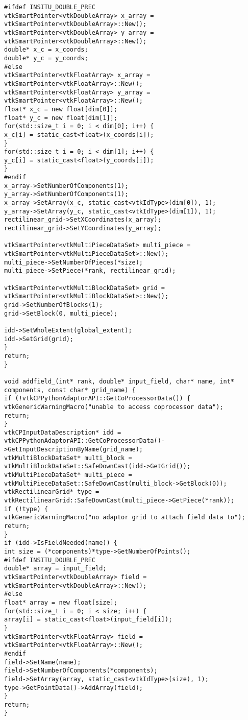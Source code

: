 \begin{lstlisting}[style=CXX, caption=C++ adaptor for ParaView Catalyst]
#ifdef INSITU_DOUBLE_PREC
vtkSmartPointer<vtkDoubleArray> x_array = vtkSmartPointer<vtkDoubleArray>::New();
vtkSmartPointer<vtkDoubleArray> y_array = vtkSmartPointer<vtkDoubleArray>::New();
double* x_c = x_coords;
double* y_c = y_coords;
#else
vtkSmartPointer<vtkFloatArray> x_array = vtkSmartPointer<vtkFloatArray>::New();
vtkSmartPointer<vtkFloatArray> y_array = vtkSmartPointer<vtkFloatArray>::New();
float* x_c = new float[dim[0]];
float* y_c = new float[dim[1]];
for(std::size_t i = 0; i < dim[0]; i++) {
x_c[i] = static_cast<float>(x_coords[i]);
}
for(std::size_t i = 0; i < dim[1]; i++) {
y_c[i] = static_cast<float>(y_coords[i]);
}
#endif
x_array->SetNumberOfComponents(1);
y_array->SetNumberOfComponents(1);
x_array->SetArray(x_c, static_cast<vtkIdType>(dim[0]), 1);
y_array->SetArray(y_c, static_cast<vtkIdType>(dim[1]), 1);
rectilinear_grid->SetXCoordinates(x_array);
rectilinear_grid->SetYCoordinates(y_array);

vtkSmartPointer<vtkMultiPieceDataSet> multi_piece = vtkSmartPointer<vtkMultiPieceDataSet>::New();
multi_piece->SetNumberOfPieces(*size);
multi_piece->SetPiece(*rank, rectilinear_grid);

vtkSmartPointer<vtkMultiBlockDataSet> grid = vtkSmartPointer<vtkMultiBlockDataSet>::New();
grid->SetNumberOfBlocks(1);
grid->SetBlock(0, multi_piece);

idd->SetWholeExtent(global_extent);
idd->SetGrid(grid);
}
return;
}

void addfield_(int* rank, double* input_field, char* name, int* components, const char* grid_name) {
if (!vtkCPPythonAdaptorAPI::GetCoProcessorData()) {
vtkGenericWarningMacro("unable to access coprocessor data");
return;
}
vtkCPInputDataDescription* idd = vtkCPPythonAdaptorAPI::GetCoProcessorData()->GetInputDescriptionByName(grid_name);
vtkMultiBlockDataSet* multi_block = vtkMultiBlockDataSet::SafeDownCast(idd->GetGrid());
vtkMultiPieceDataSet* multi_piece = vtkMultiPieceDataSet::SafeDownCast(multi_block->GetBlock(0));
vtkRectilinearGrid* type = vtkRectilinearGrid::SafeDownCast(multi_piece->GetPiece(*rank));
if (!type) {
vtkGenericWarningMacro("no adaptor grid to attach field data to");
return;
}
if (idd->IsFieldNeeded(name)) {
int size = (*components)*type->GetNumberOfPoints();
#ifdef INSITU_DOUBLE_PREC
double* array = input_field;
vtkSmartPointer<vtkDoubleArray> field = vtkSmartPointer<vtkDoubleArray>::New();
#else
float* array = new float[size];
for(std::size_t i = 0; i < size; i++) {
array[i] = static_cast<float>(input_field[i]);
}
vtkSmartPointer<vtkFloatArray> field = vtkSmartPointer<vtkFloatArray>::New();
#endif
field->SetName(name);
field->SetNumberOfComponents(*components);
field->SetArray(array, static_cast<vtkIdType>(size), 1);
type->GetPointData()->AddArray(field);
}
return;
}
\end{lstlisting}

